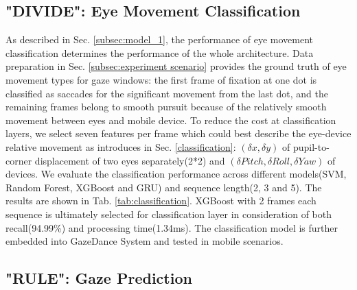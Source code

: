 \documentclass[acmlarge]{acmart}
\begin{document}
\subsection{"DIVIDE": Eye Movement Classification}
As described in Sec. \ref{subsec:model_1}, the performance of eye movement classification determines the performance of the whole architecture. Data preparation in Sec. \ref{subsec:experiment scenario} provides the ground truth of eye movement types for gaze windows: the first frame of fixation at one dot is classified as saccades for the significant movement from the last dot, and the remaining frames belong to smooth pursuit because of the relatively smooth movement between eyes and mobile device. To reduce the cost at classification layers, we select seven features per frame which could best describe the eye-device relative movement as introduces in Sec. \ref{classification}: $(\delta x,\delta y)$ of pupil-to-corner displacement of two eyes separately(2*2) and $(\delta Pitch, \delta Roll, \delta Yaw)$ of devices. We evaluate the classification performance across different models(SVM, Random Forest, XGBoost and GRU) and sequence length(2, 3 and 5). The results are shown in Tab. \ref{tab:classification}. XGBoost\cite{chen2016xgboost} with 2 frames each sequence is ultimately selected for classification layer in consideration of both recall(94.99\%) and processing time(1.34ms). The classification model is further embedded into GazeDance System and tested in mobile scenarios.



\subsection{"RULE": Gaze Prediction} 
\end{document}
